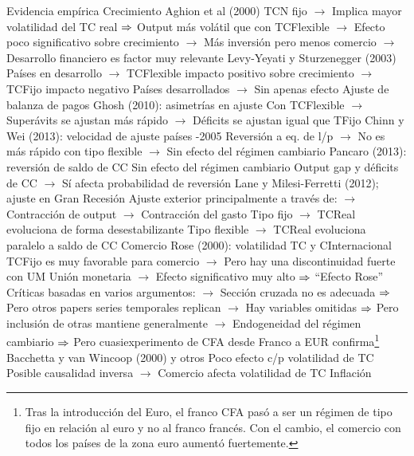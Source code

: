 \documentclass{nuevotema}
\begin{document}
\begin{esquemal}
		\2 Evidencia empírica
			\3 Crecimiento
				\4 Aghion et al (2000)
				\4[] TCN fijo
				\4[] $\to$ Implica mayor volatilidad del TC real
				\4[] $\Rightarrow$ Output más volátil que con TCFlexible
				\4[] $\to$ Efecto poco significativo sobre crecimiento
				\4[] $\to$ Más inversión pero menos comercio
				\4[] $\to$ Desarrollo financiero es factor muy relevante
				\4 Levy-Yeyati y Sturzenegger (2003)
				\4[] Países en desarrollo
				\4[] $\to$ TCFlexible impacto positivo sobre crecimiento
				\4[] $\to$ TCFijo impacto negativo
				\4[] Países desarrollados
				\4[] $\to$ Sin apenas efecto
			\3 Ajuste de balanza de pagos
				\4 Ghosh (2010): asimetrías en ajuste
				\4[] Con TCFlexible
				\4[] $\to$ Superávits se ajustan más rápido
				\4[] $\to$ Déficits se ajustan igual que TFijo
				\4 Chinn y Wei (2013): velocidad de ajuste
				 países
				-2005
				\4[] Reversión a eq. de l/p
				\4[] $\to$ No es más rápido con tipo flexible
				\4[] $\to$ Sin efecto del régimen cambiario
				\4 Pancaro (2013): reversión de saldo de CC
				\4[] Sin efecto del régimen cambiario
				\4[] Output gap y déficits de CC
				\4[] $\to$ Sí afecta probabilidad de reversión
				\4 Lane y Milesi-Ferretti (2012); ajuste en Gran Recesión
				\4[] Ajuste exterior principalmente a través de:
				\4[] $\to$ Contracción de output
				\4[] $\to$ Contracción del gasto
				\4[] Tipo fijo
				\4[] $\to$ TCReal evoluciona de forma desestabilizante
				\4[] Tipo flexible
				\4[] $\to$ TCReal evoluciona paralelo a saldo de CC
			\3 Comercio
				\4 Rose (2000): volatilidad TC y CInternacional
				\4[] TCFijo es muy favorable para comercio
				\4[] $\to$ Pero hay una discontinuidad fuerte con UM
				\4[] Unión monetaria
				\4[] $\to$ Efecto significativo muy alto
				\4[] $\Rightarrow$ ``Efecto Rose''
				\4[] Críticas basadas en varios argumentos:
				\4[] $\to$ Sección cruzada no es adecuada
				\4[] $\Rightarrow$ Pero otros papers series temporales replican
				\4[] $\to$ Hay variables omitidas
				\4[] $\Rightarrow$ Pero inclusión de otras mantiene generalmente
				\4[] $\to$ Endogeneidad del régimen cambiario
				\4[] $\Rightarrow$ Pero cuasiexperimento de CFA desde Franco a EUR confirma\footnote{Tras la introducción del Euro, el franco CFA pasó a ser un régimen de tipo fijo en relación al euro y no al franco francés. Con el cambio, el comercio con todos los países de la zona euro aumentó fuertemente.}
				\4 Bacchetta y van Wincoop (2000) y otros
				\4[] Poco efecto c/p volatilidad de TC
				\4[] Posible causalidad inversa
				\4[] $\to$ Comercio afecta volatilidad de TC
			\3 Inflación

\end{esquemal}
\end{document}
